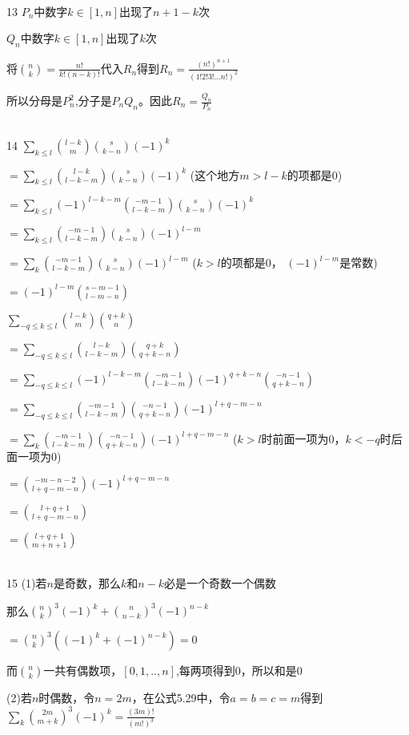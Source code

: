 \documentclass[onecolumn]{article}
\begin{document}
~\\
13 $P_{n}$中数字$k\in [1,n]$出现了$n+1-k$次 \par
$Q_{n}$中数字$k\in [1,n]$出现了$k$次 \par
将$\binom{n}{k}=\frac{n!}{k!(n-k)!}$代入$R_{n}$得到$R_{n}=\frac{(n!)^{n+1}}{(1!2!3!...n!)^{2}}$ \par
所以分母是$P_{n}^{2}$,分子是$P_{n}Q_{n}$。因此$R_{n}=\frac{Q_{n}}{P_{n}}$ \par
~\\
14 $\sum_{k \le l}\binom{l-k}{m}\binom{s}{k-n}(-1)^{k}$ \par
$=\sum_{k \le l}\binom{l-k}{l-k-m}\binom{s}{k-n}(-1)^{k}$ (这个地方$m>l-k$的项都是0)\par
$=\sum_{k \le l}(-1)^{l-k-m}\binom{-m-1}{l-k-m}\binom{s}{k-n}(-1)^{k}$ \par
$=\sum_{k \le l}\binom{-m-1}{l-k-m}\binom{s}{k-n}(-1)^{l-m}$ \par
$=\sum_{k}\binom{-m-1}{l-k-m}\binom{s}{k-n}(-1)^{l-m}$ ($k>l$的项都是0， $(-1)^{l-m}$是常数)\par
$=(-1)^{l-m}\binom{s-m-1}{l-m-n}$ \par
$\sum_{-q \le k \le l}\binom{l-k}{m}\binom{q+k}{n}$\par
$=\sum_{-q \le k \le l}\binom{l-k}{l-k-m}\binom{q+k}{q+k-n}$ \par
$=\sum_{-q \le k \le l}(-1)^{l-k-m}\binom{-m-1}{l-k-m}(-1)^{q+k-n}\binom{-n-1}{q+k-n}$ \par
$=\sum_{-q \le k \le l}\binom{-m-1}{l-k-m}\binom{-n-1}{q+k-n}(-1)^{l+q-m-n}$ \par
$=\sum_{k}\binom{-m-1}{l-k-m}\binom{-n-1}{q+k-n}(-1)^{l+q-m-n}$ ($k>l$时前面一项为0，$k<-q$时后面一项为0)\par
$=\binom{-m-n-2}{l+q-m-n}(-1)^{l+q-m-n}$ \par
$=\binom{l+q+1}{l+q-m-n}$ \par
$=\binom{l+q+1}{m+n+1}$ \par
~\\
15 (1)若$n$是奇数，那么$k$和$n-k$必是一个奇数一个偶数\par
那么$\binom{n}{k}^{3}(-1)^{k}+\binom{n}{n-k}^{3}(-1)^{n-k}$ \par
$=\binom{n}{k}^{3}((-1)^{k}+(-1)^{n-k})=0$ \par
而$\binom{n}{k}$一共有偶数项，$[0,1,..,n]$,每两项得到0，所以和是0\par
(2)若$n$时偶数，令$n=2m$，在公式5.29中，令$a=b=c=m$得到$\sum_{k}\binom{2m}{m+k}^{3}(-1)^{k}=\frac{(3m)!}{(m!)^{3}}$ \par
\end{document}
